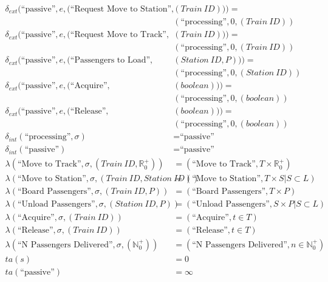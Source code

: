 \begin{align*}
\delta_{ext}(\text{``passive''},e,(\text{``Request Move to Station''},&(Train\ ID))) = \\
&(\text{``processing''},0,(Train\ ID)) \\
\delta_{ext}(\text{``passive''},e,(\text{``Request Move to Track''},&(Train\ ID))) = \\
&(\text{``processing''},0,(Train\ ID)) \\
\delta_{ext}(\text{``passive''},e,(\text{``Passengers to Load''},&(Station\ ID,P))) = \\
&(\text{``processing''},0,(Station\ ID)) \\
\delta_{ext}(\text{``passive''},e,(\text{``Acquire''},&(boolean))) = \\
&(\text{``processing''},0,(boolean)) \\
\delta_{ext}(\text{``passive''},e,(\text{``Release''},&(boolean))) = \\
&(\text{``processing''},0,(boolean)) \\
\delta_{int}(\text{``processing''},\sigma) &= \text{``passive''} \\
\delta_{int}(\text{``passive''}) &= \text{``passive''} \\
\lambda(\text{``Move to Track''},\sigma,(Train\ ID,\mathbb{R}_0^+)) &= (\text{``Move to Track''},T\times\mathbb{R}_0^+) \\
\lambda(\text{``Move to Station''},\sigma,(Train\ ID,Station\ ID)) &= (\text{``Move to Station''},T\times S | S\subset L) \\
\lambda(\text{``Board Passengers''},\sigma,(Train\ ID,P)) &= (\text{``Board Passengers''},T\times P) \\
\lambda(\text{``Unload Passengers''},\sigma,(Station\ ID,P)) &= (\text{``Unload Passengers''}, S\times P | S\subset L) \\
\lambda(\text{``Acquire''},\sigma,(Train\ ID)) &= (\text{``Acquire''},t\in T) \\
\lambda(\text{``Release''},\sigma,(Train\ ID)) &= (\text{``Release''},t\in T) \\
\lambda(\text{``N Passengers Delivered''},\sigma,(\mathbb{N}_0^+)) &= (\text{``N Passengers Delivered''},n\in \mathbb{N}_0^+) \\
ta(s) &= 0 \\ 
ta(\text{``passive''}) &= \infty \\
\end{align*}

